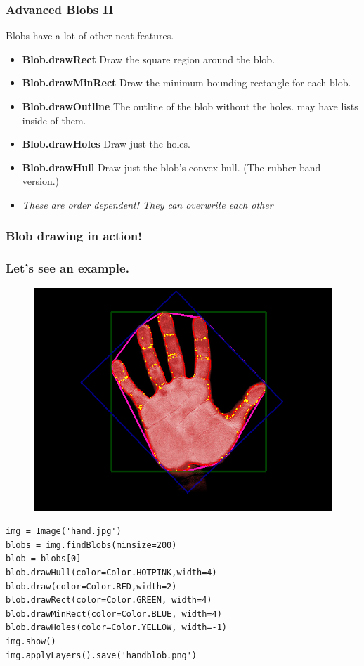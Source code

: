 \documentclass{beamer}
\begin{document}
\begin{frame}
  \frametitle{Advanced Blobs II}
Blobs have a lot of other neat features.
\begin{itemize}
\item \textbf{Blob.drawRect} Draw the square region around the blob.
\item \textbf{Blob.drawMinRect} Draw the minimum bounding rectangle
  for each blob.
\item \textbf{Blob.drawOutline} The outline of the blob without the holes.
  may have lists inside of them. 
\item \textbf{Blob.drawHoles} Draw just the holes. 
\item \textbf{Blob.drawHull} Draw just the blob's convex hull. (The
  rubber band version.)
\item \textit{These are order dependent! They can overwrite each other}
\end{itemize}
\end{frame}
\begin{frame}[fragile] 
\frametitle{Blob drawing in action!}
  \frametitle{Let's see an example.}
 \begin{figure}
     \includegraphics[width=0.3\linewidth]{handblob.png}
 \end{figure}
\begin{example}
\begin{verbatim}
img = Image('hand.jpg')
blobs = img.findBlobs(minsize=200)
blob = blobs[0]
blob.drawHull(color=Color.HOTPINK,width=4)
blob.draw(color=Color.RED,width=2)
blob.drawRect(color=Color.GREEN, width=4)
blob.drawMinRect(color=Color.BLUE, width=4)
blob.drawHoles(color=Color.YELLOW, width=-1)
img.show()
img.applyLayers().save('handblob.png')
\end{verbatim}
\end{example}
\end{frame}
\end{document}
